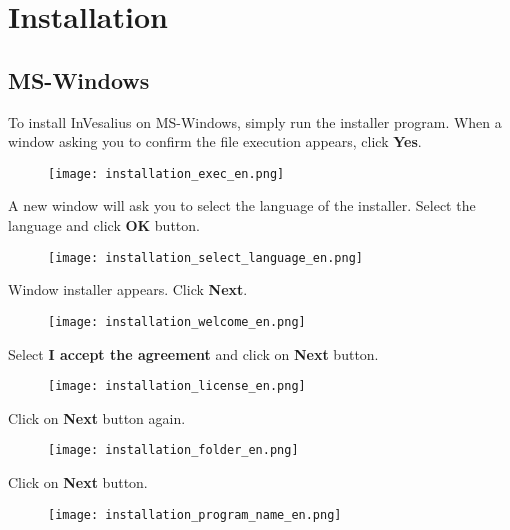 \chapter{Installation}

\section{MS-Windows}


To install InVesalius on MS-Windows, simply run the installer program. When a window asking you to confirm the file execution appears, click \textbf{Yes}.

\begin{figure}[!htb]
\centering
\texttt{[image: installation\_exec\_en.png]}
\end{figure}

\newpage

A new window will ask you to select the language of the installer. Select the language and click \textbf{OK} button.

\begin{figure}[!htb]
\centering
\texttt{[image: installation\_select\_language\_en.png]}
\end{figure}
 
\hspace{.2cm}

Window installer appears. Click \textbf{Next}.


\begin{figure}[!htb]
\centering
\texttt{[image: installation\_welcome\_en.png]}
\end{figure}

\newpage

Select \textbf{I accept the agreement} and click on \textbf{Next} button.

\begin{figure}[!htb] 
\centering
\texttt{[image: installation\_license\_en.png]}
\end{figure}

\hspace{.2cm}

Click on \textbf{Next} button again. 

\begin{figure}[!htb]  
\centering
\texttt{[image: installation\_folder\_en.png]}
\end{figure}

\newpage

Click on \textbf{Next}  button.
\begin{figure}[!htb]
\centering
\texttt{[image: installation\_program\_name\_en.png]}
\end{figure}

